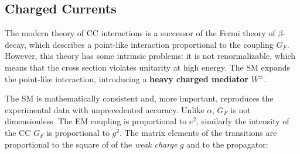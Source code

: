 \documentclass[10.75pt,a4paper,openright,bottom=2cm]{article}
\begin{document}
\subsection{Charged Currents}
The modern theory of CC interactions is a successor of the Fermi theory of $\beta$-decay, which describes a point-like interaction proportional to the coupling $G_F$. However, this theory has some intrinsic problems: it is not renormalizable, which means that the cross section violates unitarity at high energy. The SM expands the point-like interaction, introducing a \textbf{heavy charged mediator} $W^\pm$.\\
\begin{minipage}{0.5\textwidth}
\begin{center}
\end{center}    
\end{minipage}\hfill
\begin{minipage}{0.5\textwidth}
\begin{center}
\end{center}    
\end{minipage}
The SM is mathematically consistent and, more important, reproduces the experimental data with unprecedented accuracy. Unlike $\alpha$, $G_F$ is not dimensionless. The EM coupling is proportional to $e^2$, similarly the intensity of the CC $G_F$ is proportional to $g^2$. The matrix elements of the transitions are proportional to the square of of the \textit{weak charge} $g$ and to the propagator:
\end{document}
